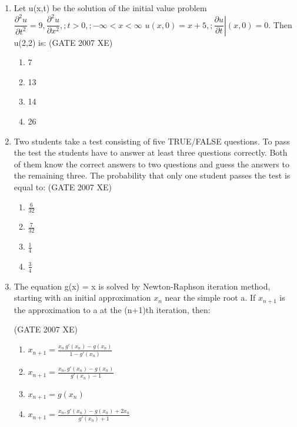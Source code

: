 \documentclass[journal,cmex10]{IEEEtran}
\theoremstyle{remark}
\numberwithin{equation}{enumi}
\numberwithin{figure}{enumi}
\begin{document}
\begin{enumerate}
    \item Let u(x,t) be the solution of the initial value problem $ \dfrac{\partial^{2}u}{\partial t^{2}} = 9,\dfrac{\partial^{2}u}{\partial x^{2}},; t>0,; -\infty<x<\infty $
$ u(x,0)=x+5,; \left.\dfrac{\partial u}{\partial t}\right|(x,0)=0 $. Then u(2,2) is:
    \hfill{(GATE 2007 XE)}
    \begin{multicols}{4}
        \begin{enumerate}
        \item 7
        \item 13
        \item 14
        \item 26
    \end{enumerate}
\end{multicols}

    \item Two students take a test consisting of five TRUE/FALSE questions. To pass the test the students have to answer at least three questions correctly. Both of them know the correct answers to two questions and guess the answers to the remaining three. The probability that only one student passes the test is equal to:
    \hfill{(GATE 2007 XE)}
    \begin{multicols}{4}
    \begin{enumerate}
    
        \item $\frac{6}{32}$
        \item $\frac{7}{32}$
        \item $\frac{1}{4}$
        \item $\frac{3}{4}$
    \end{enumerate}
    \end{multicols}

    \item The equation g(x) = x is solved by Newton-Raphson iteration method, starting with an initial approximation $x_n$ near the simple root a. If $x_{n+1}$ is the approximation to a at the (n+1)th iteration, then:

    \hfill{(GATE 2007 XE)}
    \begin{multicols}{2}
    \begin{enumerate}
        \item $ x_{n+1}=\frac{x_n\,g'(x_n)-g(x_n)}{1-g'(x_n)} $
        \item $ x_{n+1}=\frac{x_n,g'(x_n)-g(x_n)}{g'(x_n)-1} $
        \item $ x_{n+1}=g(x_n) $
        \item $ x_{n+1}=\frac{x_n,g'(x_n)-g(x_n)+2x_n}{g'(x_n)+1} $
    \end{enumerate}
\end{multicols}


\end{enumerate}
\end{document}
